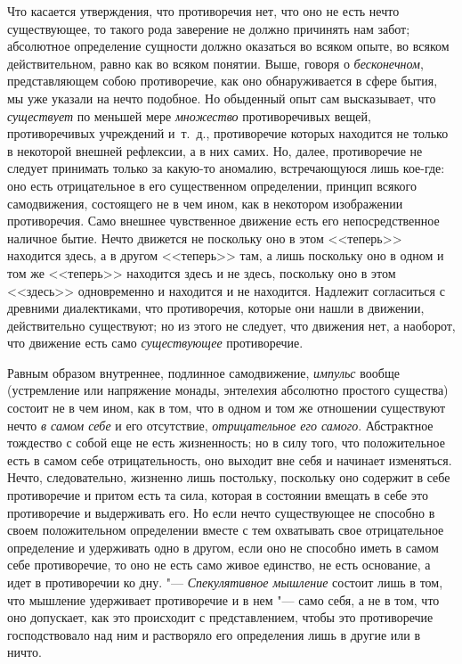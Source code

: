 Что касается утверждения, что противоречия нет, что оно не есть нечто
существующее, то такого рода заверение не должно причинять нам забот;
абсолютное определение сущности должно оказаться во всяком опыте, во всяком
действительном, равно как во всяком понятии. Выше, говоря о
{\em бесконечном}, представляющем собою противоречие,
как оно обнаруживается в сфере бытия, мы уже указали на нечто подобное. Но
обыденный опыт сам высказывает, что {\em существует} по
меньшей мере {\em множество} противоречивых вещей,
противоречивых учреждений и~т.~д., противоречие которых находится не только
в некоторой внешней рефлексии, а в них самих. Но, далее, противоречие не
следует принимать только за какую-то аномалию, встречающуюся лишь кое-где:
оно есть отрицательное в его существенном определении, принцип всякого
самодвижения, состоящего не в чем ином, как в некотором изображении
противоречия. Само внешнее чувственное движение есть его непосредственное
наличное бытие. Нечто движется не поскольку оно в этом <<теперь>> находится
здесь, а в другом <<теперь>> там, а лишь поскольку оно в одном и том же
<<теперь>> находится здесь и не здесь, поскольку оно в этом <<здесь>>
одновременно и находится и не находится. Надлежит согласиться с древними
диалектиками, что противоречия, которые они нашли в движении, действительно
существуют; но из этого не следует, что движения нет, а наоборот, что
движение есть само {\em существующее} противоречие.

Равным образом внутреннее, подлинное самодвижение,
{\em импульс} вообще (устремление или напряжение
монады, энтелехия абсолютно простого существа) состоит не в чем ином, как в
том, что в одном и том же отношении существуют нечто
{\em в самом себе} и его отсутствие,
{\em отрицательное его самого}. Абстрактное тождество с
собой еще не есть жизненность; но в силу того, что положительное есть в
самом себе отрицательность, оно выходит вне себя и начинает изменяться.
Нечто, следовательно, жизненно лишь постольку, поскольку оно содержит в
себе противоречие и притом есть та сила, которая в состоянии вмещать в себе
это противоречие и выдерживать его. Но если нечто существующее не способно
в своем положительном определении вместе с тем охватывать свое
отрицательное определение и удерживать одно в другом, если оно не способно
иметь в самом себе противоречие, то оно не есть само живое единство, не
есть основание, а идет в противоречии ко дну. "---
{\em Спекулятивное мышление} состоит лишь в том, что
мышление удерживает противоречие и в нем "--- само себя, а не в том, что оно
допускает, как это происходит с представлением, чтобы это противоречие
господствовало над ним и растворяло его определения лишь в другие или в ничто.

